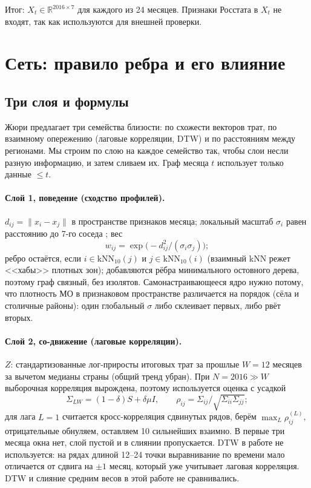 \documentclass[11pt,a4paper]{article}
\begin{document}
Итог: $X_t \in \mathbb{R}^{2016\times 7}$ для каждого из 24 месяцев. Признаки Росстата в $X_t$ не входят, так как используются для внешней проверки.

\section{Сеть: правило ребра и его влияние}\label{sec:network}

\subsection{Три слоя и формулы}\label{sec:layers}
Жюри предлагает три семейства близости: по схожести векторов трат, по взаимному опережению (лаговые корреляции, DTW) и по расстояниям между регионами. Мы строим по слою на каждое семейство так, чтобы слои несли разную информацию, и затем сливаем их. Граф месяца $t$ использует только данные $\le t$.

\paragraph{Слой 1, поведение (сходство профилей).} $d_{ij}=\|x_i-x_j\|$ в пространстве признаков месяца; локальный масштаб $\sigma_i$ равен расстоянию до 7-го соседа \cite{zelnik}; вес
\begin{equation}\label{eq:selftune}
w_{ij}=\exp\!\bigl(-d_{ij}^2/(\sigma_i\sigma_j)\bigr);
\end{equation}
ребро остаётся, если $i\in\mathrm{kNN}_{10}(j)$ и $j\in\mathrm{kNN}_{10}(i)$ (взаимный kNN режет <<хабы>> плотных зон); добавляются рёбра минимального остовного дерева, поэтому граф связный, без изолятов. Самонастраивающееся ядро нужно потому, что плотность МО в признаковом пространстве различается на порядок (сёла и столичные районы): один глобальный $\sigma$ либо склеивает первых, либо рвёт вторых.

\paragraph{Слой 2, со-движение (лаговые корреляции).} $Z$: стандартизованные лог-приросты итоговых трат за прошлые $W=12$ месяцев за вычетом медианы страны (общий тренд убран). При $N=2016\gg W$ выборочная корреляция вырождена, поэтому используется оценка с усадкой \cite{ledoit}
\begin{equation}\label{eq:lw}
\Sigma_{LW}=(1-\delta)S+\delta\mu I,\qquad \rho_{ij}=\Sigma_{ij}/\sqrt{\Sigma_{ii}\Sigma_{jj}};
\end{equation}
для лага $L=1$ считается кросс-корреляция сдвинутых рядов, берём $\max_L\rho^{(L)}_{ij}$, отрицательные обнуляем, оставляем 10 сильнейших взаимно. В первые три месяца окна нет, слой пустой и в слиянии пропускается. DTW в работе не используется: на рядах длиной 12--24 точки выравнивание по времени мало отличается от сдвига на $\pm1$ месяц, который уже учитывает лаговая корреляция. DTW и слияние средним весов в этой работе не сравнивались.
\end{document}

